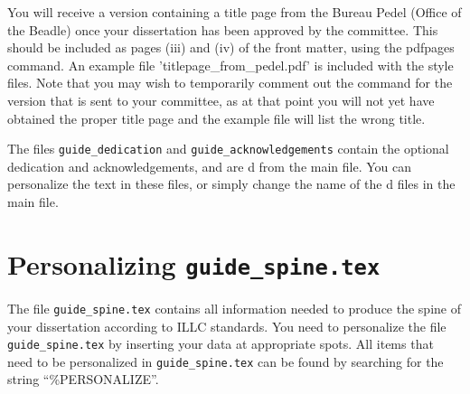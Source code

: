 You will receive a version containing a title page from the Bureau Pedel (Office of the Beadle) once your dissertation has been approved by the committee.
This should be included as pages (iii) and (iv) of the front matter, using the pdfpages \verb|| command.
An example file 'titlepage\_from\_pedel.pdf' is included with the style files.
Note that you may wish to temporarily comment out the \verb|| command for the version that is sent to your committee, as at that point you will not yet have obtained the proper title page and the example file will list the wrong title.

The files {\tt guide\_dedication} and {\tt guide\_acknowledgements} 
contain the optional dedication and acknowledgements, and are \verb||d
from the main file.
You can personalize the text in these files, or simply change the name
of the \verb||d files in the main file.

\section{Personalizing {\tt guide\_spine.tex}}
The file {\tt guide\_spine.tex} contains all information needed
to produce the spine of your dissertation according to ILLC standards.
You need to personalize the file {\tt guide\_spine.tex} by inserting 
your data at appropriate spots. All items that need to be personalized in
{\tt guide\_spine.tex} can be found by searching for the string
``\%{}PERSONALIZE''.
